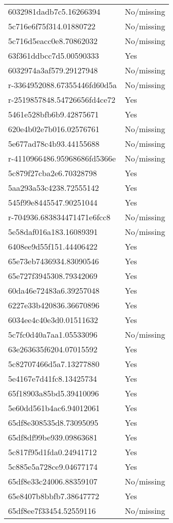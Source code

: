 \begin{tabular}{ll}
6032981dadb7c5.16266394 & No/missing \\
5c716e6f75f314.01880722 & No/missing \\
5c716d5eacc0e8.70862032 & No/missing \\
63f361ddbcc7d5.00590333 & Yes \\
6032974a3af579.29127948 & No/missing \\
r-3364952088.67355446fd60d5a & No/missing \\
r-2519857848.54726656fd4ce72 & Yes \\
5461e528bfb6b9.42875671 & Yes \\
620e4b02e7b016.02576761 & No/missing \\
5e677ad78c4b93.44155688 & No/missing \\
r-4110966486.95968686fd5366e & No/missing \\
5c879f27cba2e6.70328798 & Yes \\
5aa293a53c4238.72555142 & Yes \\
545f99e8445547.90251044 & Yes \\
r-704936.683834471471e6fcc8 & No/missing \\
5e58daf016a183.16089391 & No/missing \\
6408ee9d55f151.44406422 & Yes \\
65e73eb7436934.83090546 & Yes \\
65e727f3945308.79342069 & Yes \\
60da46e72483a6.39257048 & Yes \\
6227e33b420836.36670896 & Yes \\
6034ee4c40e3d0.01511632 & Yes \\
5c7fc0d40a7aa1.05533096 & No/missing \\
63e263635f6204.07015592 & Yes \\
5c82707466d5a7.13277880 & Yes \\
5e4167e7d41fc8.13425734 & Yes \\
65f18903a85bd5.39410096 & Yes \\
5e60dd561b4ac6.94012061 & Yes \\
65df8e308535d8.73095095 & Yes \\
65df8df99be939.09863681 & Yes \\
5c817f95d1fda0.24941712 & Yes \\
5c885e5a728ce9.04677174 & Yes \\
65df8e33c24006.88359107 & No/missing \\
65e8407b8bbfb7.38647772 & Yes \\
65df8ee7f33454.52559116 & No/missing \\

\end{tabular}
